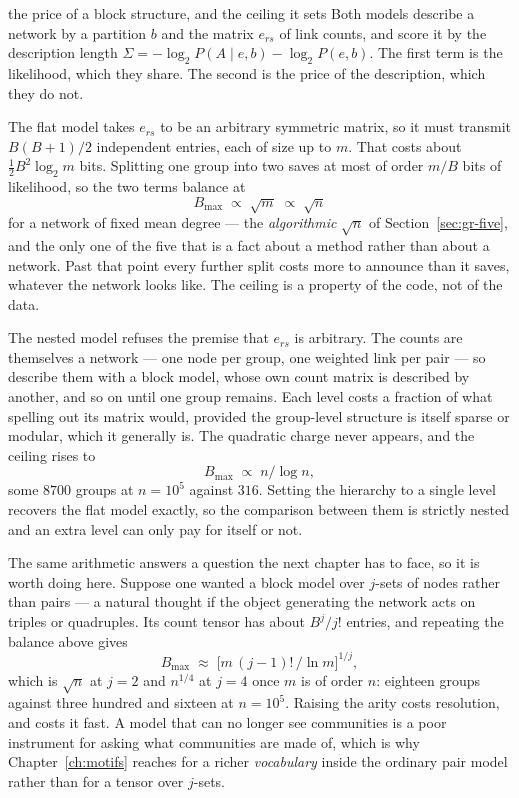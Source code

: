 \begin{calculation}{the price of a block structure, and the ceiling it sets}
Both models describe a network by a partition $b$ and the matrix $e_{rs}$ of link
counts, and score it by the description length
$\Sigma=-\log_2P(A\mid e,b)-\log_2P(e,b)$. The first term is the likelihood, which
they share. The second is the price of the description, which they do not.

The flat model takes $e_{rs}$ to be an arbitrary symmetric matrix, so it must
transmit $B(B+1)/2$ independent entries, each of size up to $m$. That costs about
$\tfrac12B^{2}\log_2 m$ bits. Splitting one group into two saves at most of order
$m/B$ bits of likelihood, so the two terms balance at
\begin{equation}
  B_{\max} \;\propto\; \sqrt{m} \;\propto\; \sqrt{n}
  \label{eq:gr-flatceiling}
\end{equation}
for a network of fixed mean degree \citep{peixoto2014hier} --- the
\emph{algorithmic} $\sqrt n$ of Section~\ref{sec:gr-five}, and the only one of the
five that is a fact about a method rather than about a network. Past that point every
further split costs more to announce than it saves, whatever the network looks
like. The ceiling is a property of the code, not of the data.

The nested model refuses the premise that $e_{rs}$ is arbitrary. The counts are
themselves a network --- one node per group, one weighted link per pair --- so
describe them with a block model, whose own count matrix is described by another,
and so on until one group remains. Each level costs a fraction of what spelling
out its matrix would, provided the group-level structure is itself sparse or
modular, which it generally is. The quadratic charge never appears, and the
ceiling rises to
\begin{equation}
  B_{\max} \;\propto\; n/\log n,
  \label{eq:gr-nestedceiling}
\end{equation}
some $8700$ groups at $n=10^{5}$ against $316$. Setting the hierarchy to a single
level recovers the flat model exactly, so the comparison between them is strictly
nested and an extra level can only pay for itself or not.

The same arithmetic answers a question the next chapter has to face, so it is
worth doing here. Suppose one wanted a block model over $j$-sets of nodes rather
than pairs --- a natural thought if the object generating the network acts on
triples or quadruples. Its count tensor has about $B^{j}/j!$ entries, and
repeating the balance above gives
\begin{equation}
  B_{\max} \;\approx\; \bigl[m\,(j-1)!\,/\ln m\bigr]^{1/j},
  \label{eq:gr-bmax}
\end{equation}
which is $\sqrt n$ at $j=2$ and $n^{1/4}$ at $j=4$ once $m$ is of order $n$:
eighteen groups against three hundred and sixteen at $n=10^{5}$. Raising the arity
costs resolution, and costs it fast. A model that can no longer see communities is
a poor instrument for asking what communities are made of, which is why
Chapter~\ref{ch:motifs} reaches for a richer \emph{vocabulary} inside the ordinary
pair model rather than for a tensor over $j$-sets.
\end{calculation}

